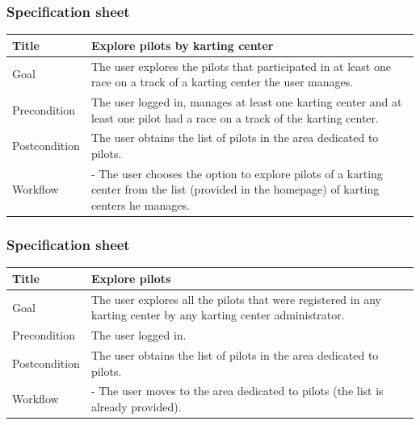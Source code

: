\documentclass{beamer}
\begin{document}
\begin{frame}
    \frametitle{Specification sheet}
    \begin{table}
        \tiny
        \begin{tabular}{|p{2cm}|p{6cm}|}
        \hline  
        Title & \textbf{Explore pilots by karting center} \\
        \hline
        Goal & The user explores the pilots that participated in at
        least one race on a track of a karting center the user manages. \\
        \hline
        Precondition & The user logged in, manages at least one karting center and at least one pilot
        had a race on a track of the karting center.\\
        \hline
        Postcondition & The user obtains the list of pilots in the area dedicated to pilots. \\
        \hline
        Workflow &
        - The user chooses the option to explore pilots of a karting center 
        from the list (provided in the homepage) of karting centers he manages. \\
        \hline
        \end{tabular}
\end{table}
\end{frame}


\begin{frame}
    \frametitle{Specification sheet}
    \begin{table}
        \tiny
        \begin{tabular}{|p{2cm}|p{6cm}|}
        \hline  
        Title & \textbf{Explore pilots} \\
        \hline
        Goal & The user explores all the pilots that were registered in any karting center
        by any karting center administrator. \\
        \hline
        Precondition & The user logged in.\\
        \hline
        Postcondition & The user obtains the list of pilots in the area dedicated to pilots. \\
        \hline
        Workflow &
        - The user moves to the area dedicated to pilots (the list is already provided). \\
        \hline
        \end{tabular}
\end{table}
\end{frame}
\end{document}
